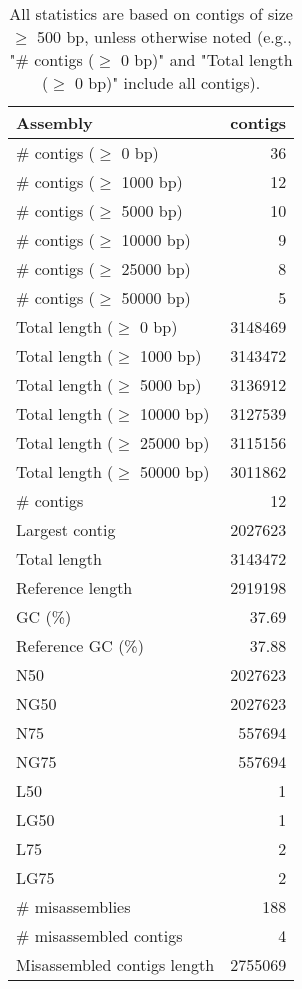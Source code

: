 \documentclass[12pt,a4paper]{article}
\begin{document}
\begin{table}[ht]
\begin{center}
\caption{All statistics are based on contigs of size $\geq$ 500 bp, unless otherwise noted (e.g., "\# contigs ($\geq$ 0 bp)" and "Total length ($\geq$ 0 bp)" include all contigs).}
\begin{tabular}{|l*{1}{|r}|}
\hline
Assembly & contigs \\ \hline
\# contigs ($\geq$ 0 bp) & 36 \\ \hline
\# contigs ($\geq$ 1000 bp) & 12 \\ \hline
\# contigs ($\geq$ 5000 bp) & 10 \\ \hline
\# contigs ($\geq$ 10000 bp) & 9 \\ \hline
\# contigs ($\geq$ 25000 bp) & 8 \\ \hline
\# contigs ($\geq$ 50000 bp) & 5 \\ \hline
Total length ($\geq$ 0 bp) & 3148469 \\ \hline
Total length ($\geq$ 1000 bp) & 3143472 \\ \hline
Total length ($\geq$ 5000 bp) & 3136912 \\ \hline
Total length ($\geq$ 10000 bp) & 3127539 \\ \hline
Total length ($\geq$ 25000 bp) & 3115156 \\ \hline
Total length ($\geq$ 50000 bp) & 3011862 \\ \hline
\# contigs & 12 \\ \hline
Largest contig & 2027623 \\ \hline
Total length & 3143472 \\ \hline
Reference length & 2919198 \\ \hline
GC (\%) & 37.69 \\ \hline
Reference GC (\%) & 37.88 \\ \hline
N50 & 2027623 \\ \hline
NG50 & 2027623 \\ \hline
N75 & 557694 \\ \hline
NG75 & 557694 \\ \hline
L50 & 1 \\ \hline
LG50 & 1 \\ \hline
L75 & 2 \\ \hline
LG75 & 2 \\ \hline
\# misassemblies & 188 \\ \hline
\# misassembled contigs & 4 \\ \hline
Misassembled contigs length & 2755069 \\ \hline

\end{tabular}
\end{center}
\end{table}
\end{document}
